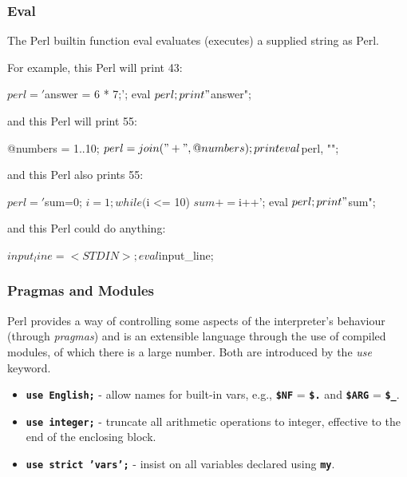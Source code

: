 \begin{frame}
\frametitle{Eval}

The Perl builtin function eval evaluates (executes) a supplied string 
as Perl.

For example, this Perl  will print 43:
\begin{perl}
    $perl = '$answer = 6 * 7;';
    eval $perl;
    print "$answer\n";
\end{perl}

and this Perl  will print 55:
\begin{perl}
    @numbers = 1..10;
    $perl = join("+", @numbers);
    print eval $perl, "\n";
\end{perl}

and this Perl also prints 55:
\begin{perl}
    $perl = '$sum=0; $i=1; while ($i <= 10) {$sum+=$i++}';
    eval $perl;
    print "$sum\n";
\end{perl}

and this Perl could do anything:
\begin{perl}
    $input_line = <STDIN>;
    eval $input_line;
\end{perl}
\end{frame}

\begin{frame}
\frametitle{Pragmas and Modules}

Perl provides a way of controlling some aspects of the interpreter's behaviour
(through {\em{pragmas}}) and is an extensible language through the
use of compiled modules, of which there is a large number.
Both are introduced by the {\em{use}} keyword.

\begin{itemize}
\item 
\textbf{\tt{use English;}} - allow names for built-in vars, e.g.,
\textbf{\tt{\$NF}} = \textbf{\tt{\$.}} and \textbf{\tt{\$ARG}} = \textbf{\tt{\$\_}}.
\item 
\textbf{\tt{use integer;}} - truncate all arithmetic operations to integer,
effective to the end of the enclosing block.
\item 
\textbf{\tt{use strict 'vars';}} - insist on all variables declared using \textbf{\tt{my}}.
\end{itemize}

\end{frame}

